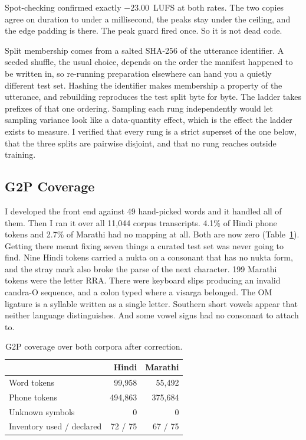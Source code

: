 \documentclass[12pt,a4paper]{article}
\begin{document}
Spot-checking confirmed exactly $-23.00$~LUFS at both rates. The two copies
agree on duration to under a millisecond, the peaks stay under the ceiling, and
the edge padding is there. The peak guard fired once. So it is not dead code.

Split membership comes from a salted SHA-256 of the utterance identifier. A
seeded shuffle, the usual choice, depends on the order the manifest happened to
be written in, so re-running preparation elsewhere can hand you a quietly
different test set. Hashing the identifier makes membership a property of the
utterance, and rebuilding reproduces the test split byte for byte. The ladder
takes prefixes of that one ordering. Sampling each rung independently would let
sampling variance look like a data-quantity effect, which is the effect the
ladder exists to measure. I verified that every rung is a strict
superset of the one below, that the three splits are pairwise disjoint, and
that no rung reaches outside training.

\subsection{G2P Coverage}

I developed the front end against 49 hand-picked words and it handled all of
them. Then I ran it over all 11{,}044 corpus transcripts. 4.1\% of Hindi phone
tokens and 2.7\% of Marathi had no mapping at all. Both are now zero (Table~\ref{tab:coverage}). Getting there meant fixing seven
things a curated test set was never going to find. Nine Hindi tokens carried a
nukta on a consonant that has no nukta form, and the stray mark also broke the
parse of the next character. 199 Marathi tokens were the letter RRA. There were
keyboard slips producing an invalid candra-O sequence, and a colon typed where
a visarga belonged. The OM ligature is a syllable written as a single letter.
Southern short vowels appear that neither language distinguishes. And some
vowel signs had no consonant to attach to.

\begin{table}[htbp]
\centering\small
\caption{G2P coverage over both corpora after correction.}
\label{tab:coverage}
\begin{tabular}{lrr}
\toprule
& Hindi & Marathi \\
\midrule
Word tokens & 99{,}958 & 55{,}492 \\
Phone tokens & 494{,}863 & 375{,}684 \\
Unknown symbols & 0 & 0 \\
Inventory used / declared & 72 / 75 & 67 / 75 \\
\bottomrule
\end{tabular}
\end{table}
\end{document}
